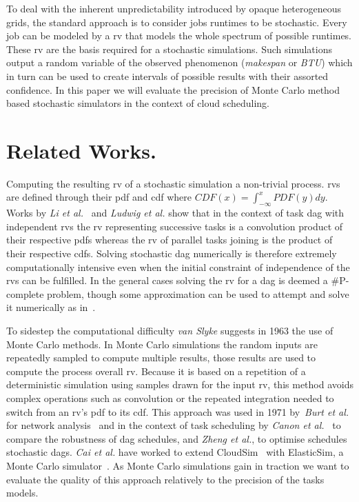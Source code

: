 \documentclass[10pt,conference,compsocconf]{IEEEtran}
\newcommand{\etal}[1]{\emph{#1 et al.}}
\begin{document}
To deal with the inherent unpredictability introduced by opaque heterogeneous
grids, the standard approach is to consider jobs runtimes to be stochastic.
Every job can be modeled by a \ac{rv} that models the whole spectrum of
possible runtimes. These \ac{rv} are the basis required for a stochastic
simulations.  Such simulations output a random variable of the observed
phenomenon (\emph{makespan} or \emph{\ac{BTU}}) which in turn can be used to
create intervals of possible results with their assorted confidence. In this
paper we will evaluate the precision of Monte Carlo method based stochastic
simulators in the context of cloud scheduling.

\section{Related Works.}

Computing the resulting \ac{rv} of a stochastic simulation a non-trivial
process.  \acp{rv} are defined through their \ac{pdf} and \ac{cdf} where $CDF(x)
= \int_{-\infty}^{x} PDF(y) dy$. Works by \etal{Li}~\cite{Li97} and
\etal{Ludwig}\cite{Ludwig01} show that in the context of task \ac{dag} with
independent \acp{rv} the \ac{rv} representing successive tasks is a convolution
product of their respective \acp{pdf} whereas the \ac{rv} of parallel tasks
joining is the product of their respective \acp{cdf}. Solving stochastic
\ac{dag} numerically is therefore extremely computationally intensive even when
the initial constraint of independence of the \acp{rv} can be fulfilled. In the
general cases solving the \ac{rv} for a \ac{dag} is deemed a \#P-complete
problem, though some approximation can be used to attempt and solve it
numerically as in~\cite{dodin85}.

To sidestep the computational difficulty \emph{van Slyke} suggests in
1963\cite{Slyke63} the use of Monte Carlo methods. In Monte Carlo
simulations the random inputs are repeatedly sampled to compute multiple
results, those results are used to compute the process overall \acl{rv}. Because
it is based on a repetition of a deterministic simulation using samples drawn
for the input \ac{rv}, this method avoids complex operations such as
convolution or the repeated integration needed to switch from an \ac{rv}'s
\ac{pdf} to its \ac{cdf}. This approach was used in 1971 by~\etal{Burt} for
network analysis~\cite{burt71} and in the context of task scheduling by
\etal{Canon}~\cite{Canon10} to compare the robustness of \ac{dag} schedules, and
\etal{Zheng}, to optimise schedules stochastic \acp{dag}. \etal{Cai} have worked
to extend CloudSim~\cite{cloudsim} with ElasticSim, a Monte Carlo
simulator~\cite{cai16}. As Monte Carlo simulations gain in traction we want to
evaluate the quality of this approach relatively to the precision of the tasks
models.
\end{document}
